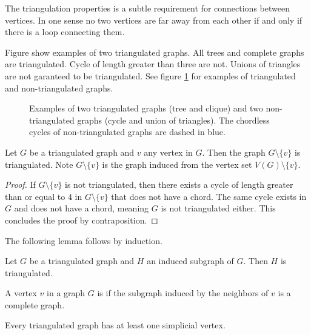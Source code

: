 The triangulation properties is a subtle requirement for connections between vertices. 
In one sense no two vertices are far away from each other if and only if there is a loop connecting them. 

Figure show examples of two triangulated graphs. All trees and complete graphs are triangulated. 
Cycle of length greater than three are not. 
Unions of triangles are not garanteed to be triangulated.
See figure \ref{fig:triangulated_example} for examples of triangulated and non-triangulated graphs.

\begin{figure}[ht]
	\centering
	
	\caption{Examples of two triangulated graphs (tree and clique) and two non-triangulated graphs (cycle and union of triangles).
	The chordless cycles of non-triangulated graphs are dashed in blue.}
	\label{fig:triangulated_example}
\end{figure}

\begin{lemma}\label{lem:eleminate_vertex_triangulated}
	Let $G$ be a triangulated graph and $v$ any vertex in $G$. Then the graph $G \setminus \{v\}$ is triangulated.
	Note $G \setminus \{v\}$ is the graph induced from the vertex set $V(G) \setminus \{v\}$.
\end{lemma}

\begin{proof}
	If $G\setminus \{v\}$ is not triangulated, then there exists a cycle of length greater than or equal to $4$ in $G\setminus \{v\}$ that does not have a chord.
	The same cycle exists in $G$ and does not have a chord, meaning $G$ is not triangulated either.
	This concludes the proof by contraposition.
\end{proof}

The following lemma follows by induction. 

\begin{lemma}
	Let $G$ be a triangulated graph and $H$ an induced subgraph of $G$. Then $H$ is triangulated.
\end{lemma}

\begin{definition}
	A vertex $v$ in a graph $G$ is  if the subgraph induced by the neighbors of $v$ is a complete graph.
\end{definition}

\begin{lemma}\label{lem:simplicial_vertex}
	Every triangulated graph has at least one simplicial vertex.
\end{lemma}

